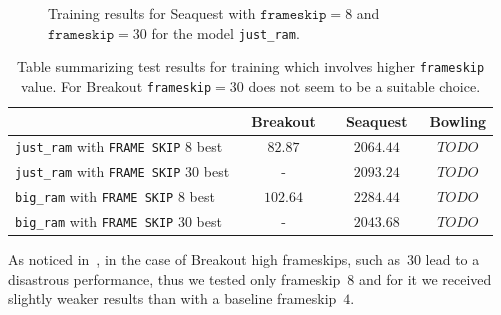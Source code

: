 \begin{figure}[h]
\centering
{}
\caption{Training results for Seaquest with 
$\texttt{frameskip} = 8$ and  $\texttt{frameskip} = 30$ for the model \texttt{just\_ram}.}
\label{fig:seaquest-frameskip}
\end{figure}

\begin{table}[h]
\centering
\begin{tabularx}{0.9\textwidth}{ X c c c }
  \toprule
   &\ Breakout\ &\ Seaquest\ & Bowling \\
  \midrule
  \texttt{just\_ram} with \texttt{FRAME SKIP} $8$ best & $82.87$  & $2064.44$ & $TODO$\\
  \texttt{just\_ram} with \texttt{FRAME SKIP} $30$ best & -  & $2093.24$ & $TODO$\\
  \texttt{big\_ram} with \texttt{FRAME SKIP} $8$ best & $102.64$ & $2284.44$ & $TODO$ \\
  \texttt{big\_ram} with \texttt{FRAME SKIP} $30$ best & - & $2043.68$ & $TODO$\\
  \bottomrule
\end{tabularx}
\caption{Table summarizing test results for training which involves higher \texttt{frameskip} value. For Breakout \texttt{frameskip}$
=30$ does not seem to be a suitable choice.}
\label{table:results-frameskip}
\end{table}


As noticed in~\cite{frameskip}, in the case of Breakout high frameskips, such as~$30$ lead to a disastrous performance, thus we tested only frameskip~$8$ and for it we received slightly weaker results than with a baseline frameskip~$4$.

